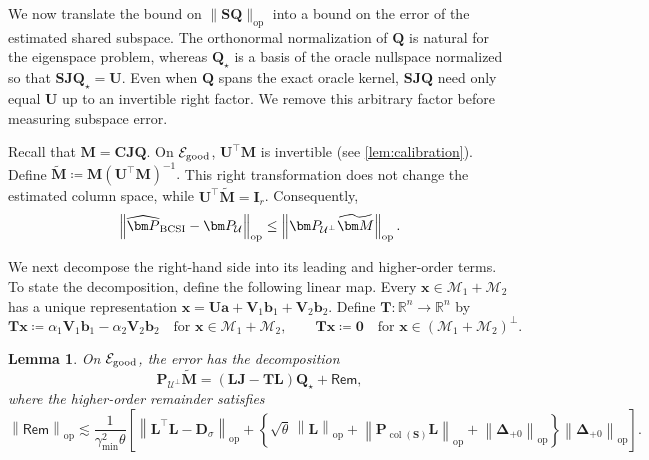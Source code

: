 \documentclass[11pt]{article}
\newtheorem{lemma}{Lemma}
\newcommand{\trans}{\top}
\DeclareMathOperator{\col}{col}
\newcommand{\opn}[1]{\left\lVert #1\right\rVert_{\mathrm{op}}}
\newcommand{\cU}{\mathcal{U}}
\newcommand{\cM}{\mathcal{M}}
\newcommand{\cE}{\mathcal{E}}
\newcommand{\gmin}{\gamma_{\min}}
\begin{document}
We now translate the bound on
$\|\bm S\bm Q\|_{\mathrm{op}}$ into a bound on the error of the estimated shared subspace.
The orthonormal normalization of $\bm Q$ is natural for the eigenspace
problem, whereas $\bm Q_\star$ is a basis of the oracle nullspace normalized so that
$\bm S\bm J\bm Q_\star=\bm U$.  Even when $\bm Q$ spans the exact oracle
kernel, $\bm S\bm J\bm Q$ need only equal $\bm U$ up to an invertible right
factor.  We remove this arbitrary factor before measuring subspace error.


Recall that $\bm M=\bm C\bm J\bm Q$. On $\cE_{\rm good}$, $\bm U^\trans\bm M$ is invertible (see
\cref{lem:calibration}).  Define
$
  \widetilde{\bm M}
  \coloneqq
  \bm M(\bm U^\trans\bm M)^{-1}.
$
This right transformation does not change the estimated column space, while
$\bm U^\trans\widetilde{\bm M}=\bm I_r$.  Consequently,
\begin{equation}
\label{eq:one-sided-reconstruction}
  \opn{
    \widehat{\bm P}_{\rm BCSI}-\bm P_{\cU}
  }
  \le
  \opn{
    \bm P_{\cU^\perp}\widetilde{\bm M}
  }.
\end{equation}

We next decompose the right-hand side into its leading and higher-order
terms.  To state the decomposition, define the following linear map.
Every $\bm x\in\cM_1+\cM_2$ has a unique representation
$\bm x=\bm U\bm a+\bm V_1\bm b_1+\bm V_2\bm b_2$.  Define
$\bm T:\mathbb R^n\to\mathbb R^n$ by
\begin{equation}
\label{eq:transfer-operator}
  \bm T\bm x
  \coloneqq
  \alpha_1\bm V_1\bm b_1-\alpha_2\bm V_2\bm b_2
  \quad\text{for }\bm x\in\cM_1+\cM_2,
  \qquad
  \bm T\bm x\coloneqq\bm 0
  \quad\text{for }\bm x\in(\cM_1+\cM_2)^\perp.
\end{equation}

\begin{lemma}
\label{lem:error-decomposition}
On $\cE_{\rm good}$, the error has the decomposition
\begin{equation}
\label{eq:error-decomposition}
  \bm P_{\cU^\perp}\widetilde{\bm M}
  =
  (\bm L\bm J-\bm T\bm L)\bm Q_\star
  +
  \bm{\mathsf{Rem}},
\end{equation}
where the higher-order remainder satisfies
\begin{equation}
\label{eq:higher-order-deterministic}
  \opn{\bm{\mathsf{Rem}}}
  \lesssim
  \frac{1}{\gmin^2\theta}
  \left[
    \opn{\bm L^\trans\bm L-\bm D_\sigma}
    +
    \left\{
      \sqrt\theta\,\opn{\bm L}
      +
      \opn{\bm P_{\col(\bm S)}\bm L}
      +
      \opn{\bm\Delta_{+0}}
    \right\}
    \opn{\bm\Delta_{+0}}
  \right].
\end{equation}
\end{lemma}
\end{document}
